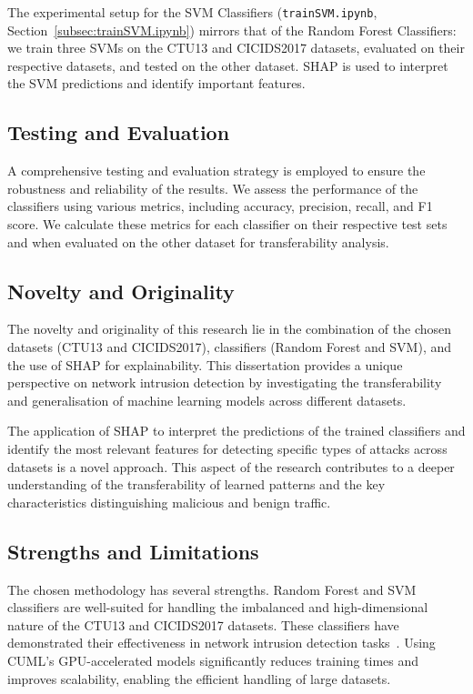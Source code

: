 The experimental setup for the SVM Classifiers (\texttt{trainSVM.ipynb}, Section~\ref{subsec:trainSVM.ipynb}) mirrors that of the Random Forest Classifiers: we train three SVMs on the CTU13 and CICIDS2017 datasets, evaluated on their respective datasets, and tested on the other dataset. SHAP is used to interpret the SVM predictions and identify important features.

\subsection{Testing and Evaluation}\label{subsec:testing-evaluation}
A comprehensive testing and evaluation strategy is employed to ensure the robustness and reliability of the results. We assess the performance of the classifiers using various metrics, including accuracy, precision, recall, and F1 score. We calculate these metrics for each classifier on their respective test sets and when evaluated on the other dataset for transferability analysis.

\subsection{Novelty and Originality}\label{subsec:novelty-originality}
The novelty and originality of this research lie in the combination of the chosen datasets (CTU13 and CICIDS2017), classifiers (Random Forest and SVM), and the use of SHAP for explainability. This dissertation provides a unique perspective on network intrusion detection by investigating the transferability and generalisation of machine learning models across different datasets.

The application of SHAP to interpret the predictions of the trained classifiers and identify the most relevant features for detecting specific types of attacks across datasets is a novel approach. This aspect of the research contributes to a deeper understanding of the transferability of learned patterns and the key characteristics distinguishing malicious and benign traffic.

\subsection{Strengths and Limitations}\label{subsec:strengths-limitations}
The chosen methodology has several strengths. Random Forest and SVM classifiers are well-suited for handling the imbalanced and high-dimensional nature of the CTU13 and CICIDS2017 datasets. These classifiers have demonstrated their effectiveness in network intrusion detection tasks~\cite{farnaaz2016random, teng2017svm}. Using CUML's GPU-accelerated models significantly reduces training times and improves scalability, enabling the efficient handling of large datasets.

